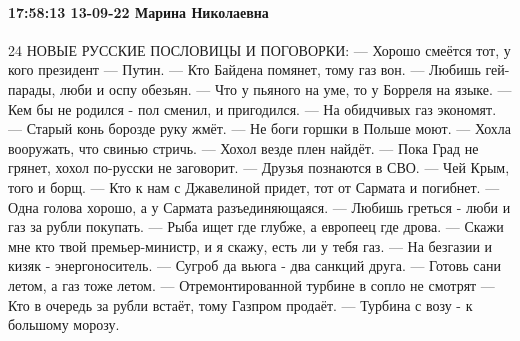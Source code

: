 \paragraph{17:58:13 13-09-22 Марина Николаевна}

24 НОВЫЕ РУССКИЕ ПОСЛОВИЦЫ И ПОГОВОРКИ:
— Хорошо смеётся тот, у кого президент — Путин.
— Кто Байдена помянет, тому газ вон.
— Любишь гей-парады, люби и оспу обезьян.
— Что у пьяного на уме, то у Борреля на языке.
— Кем бы не родился - пол сменил, и пригодился.
— На обидчивых газ экономят.
— Старый конь борозде руку жмёт.
— Не боги горшки в Польше моют.
— Хохла вооружать, что свинью стричь.
— Хохол везде плен найдёт.
— Пока Град не грянет, хохол по-русски не заговорит.
— Друзья познаются в СВО.
— Чей Крым, того и борщ.
— Кто к нам с Джавелиной придет, тот от Сармата и погибнет.
— Одна голова хорошо, а у Сармата разъединяющаяся.
— Любишь греться - люби и газ за рубли покупать.
— Рыба ищет где глубже, а европеец где дрова.
— Скажи мне кто твой премьер-министр, и я скажу, есть ли у тебя газ.
— На безгазии и кизяк - энергоноситель.
— Сугроб да вьюга - два санкций друга.
— Готовь сани летом, а газ тоже летом.
— Отремонтированной турбине в сопло не смотрят
— Кто в очередь за рубли встаёт, тому Газпром продаёт.
— Турбина с возу - к большому морозу.

